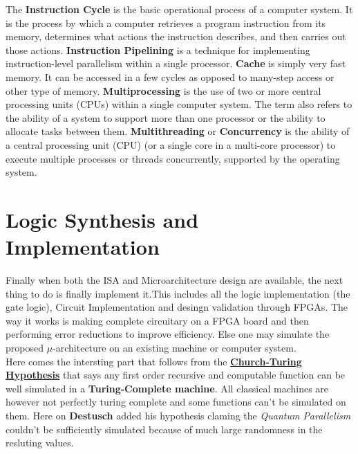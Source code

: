 The \textbf{Instruction Cycle} is the basic operational process of a computer system. It is the process by which a computer retrieves a program instruction from its memory, determines what actions the instruction describes, and then carries out those actions. \textbf{Instruction Pipelining} is a technique for implementing instruction-level parallelism within a single processor. \textbf{Cache} is simply very fast memory. It can be accessed in a few cycles as opposed to many-step access or other type of memory. \textbf{Multiprocessing} is the use of two or more central processing units (CPUs) within a single computer system. The term also refers to the ability of a system to support more than one processor or the ability to allocate tasks between them. \textbf{Multithreading} or \textbf{Concurrency} is the ability of a central processing unit (CPU) (or a single core in a multi-core processor) to execute multiple processes or threads concurrently, supported by the operating system. \\ 

\section{Logic Synthesis and Implementation}

Finally when both the ISA and Microarchitecture design are available, the next thing to do is finally implement it.This includes all the logic implementation (the gate logic), Circuit Implementation and desingn validation through FPGAs. The way it works is making complete circuitary on a FPGA board and then performing error reductions to improve efficiency. Else one may simulate the proposed $\mu$-architecture on an existing machine or computer system.\\


Here comes the intersting part that follows from the \underline{\textbf{Church-Turing Hypothesis}} that says any first order recursive and computable function can be well simulated in a \textbf{Turing-Complete machine}. All classical machines are however not perfectly turing complete and some functions can't be simulated on them. Here on \textbf{Destusch} added his hypothesis claming the \textit{Quantum Parallelism} couldn't be sufficiently simulated because of much large randomness in the resluting values.
